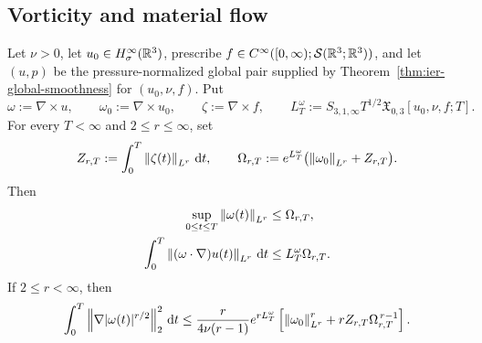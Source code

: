 \subsection{Vorticity and material flow}

\begin{theorem}
\label{thm:app-vorticity-amplification}
Let \(\nu>0\), let \(u_0\in H^\infty_\sigma(\mathbb R^3)\), prescribe
\(f\in C^\infty([0,\infty);\mathcal S(\mathbb R^3;\mathbb R^3))\), and let \((u,p)\) be the
pressure-normalized global pair supplied by
Theorem~\ref{thm:ier-global-smoothness} for \((u_0,\nu,f)\).  Put
\[
 \omega:=\nabla\times u,
 \qquad
 \omega_0:=\nabla\times u_0,
 \qquad
 \zeta:=\nabla\times f,
 \qquad
 L_T^\omega:=S_{3,1,\infty}T^{1/2}
 \mathfrak X_{0,3}[u_0,\nu,f;T].
\]
For every \(T<\infty\) and \(2\le r\le\infty\),
set
\[
 Z_{r,T}:=\int_0^T\left\lVert \zeta(t)\right\rVert_{L^r}\,\mathrm d t,
 \qquad
 \Omega_{r,T}:=
 e^{L_T^\omega}\bigl(\left\lVert \omega_0\right\rVert_{L^r}+Z_{r,T}\bigr).
\]
Then
\begin{align}
 \sup_{0\le t\le T}\left\lVert \omega(t)\right\rVert_{L^r}
 &\le \Omega_{r,T},
 \label{eq:app-vorticity-Lr-amplification}\\
 \int_0^T\left\lVert (\omega\cdot\nabla)u(t)\right\rVert_{L^r}\,\mathrm d t
 &\le L_T^\omega\Omega_{r,T}.
 \label{eq:app-vortex-stretching-action}
\end{align}
If \(2\le r<\infty\), then
\begin{equation}
 \int_0^T\left\lVert \nabla|\omega(t)|^{r/2}\right\rVert_2^2\,\mathrm d t
 \le \frac{r}{4\nu(r-1)}e^{rL_T^\omega}
 \left[
 \left\lVert \omega_0\right\rVert_{L^r}^r
 +rZ_{r,T}\Omega_{r,T}^{\,r-1}
 \right].
 \label{eq:app-vorticity-dissipation}
\end{equation}
\end{theorem}

